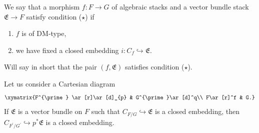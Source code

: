 \begin{condition}\label{manolacheVirtualPullbacks2012-condition-3.3}
 We say that a morphism $f:F\to G$ of algebraic stacks and a vector bundle stack $\mathfrak{E}\to F$ satisfy condition ($\star$) if
\begin{enumerate}
\item $f$ is of DM-type,
\item we have fixed a closed embedding $i:C_{f}\hookrightarrow \mathfrak{E}$.
\end{enumerate}
\end{condition}

\begin{convention}\label{manolacheVirtualPullbacks2012-convention-3.4}
Will say in short that the pair $(f,\mathfrak{E})$ satisfies condition ($\star$).
\end{convention}

\begin{remark}\label{manolacheVirtualPullbacks2012-rem-3.5}
Let us consider a Cartesian diagram
\begin{equation*}
 \xymatrix {F^{\prime} \ar[r]\ar[d]_{p} & G^{\prime}\ar[d]^q\\
             F\ar[r]^f & G.}
\end{equation*}
If $\mathfrak{E}$ is a vector bundle on $F$ such that $C_{F/G}\hookrightarrow \mathfrak{E}$ is a closed embedding, then $C_{F^{\prime}/G^{\prime}}\hookrightarrow p^*\mathfrak{E}$ is a closed embedding.
\end{remark}

